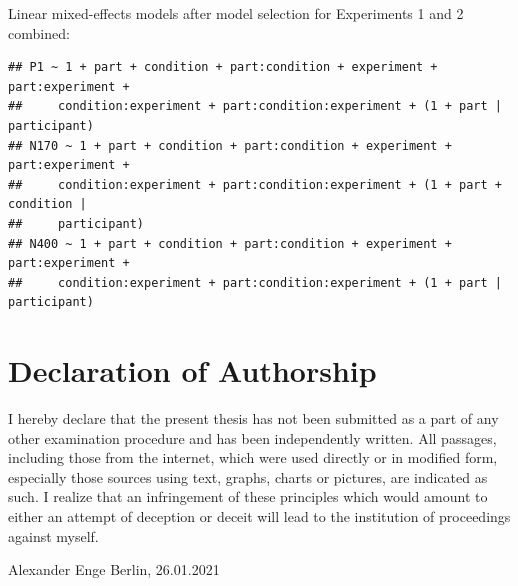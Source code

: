 \documentclass[
  english,
  doc,12pt,twoside,floatsintext]{apa7}
\begin{document}
\normalsize

\noindent Linear mixed-effects models after model selection for Experiments 1 and 2 combined:

\footnotesize

\begin{verbatim}
## P1 ~ 1 + part + condition + part:condition + experiment + part:experiment + 
##     condition:experiment + part:condition:experiment + (1 + part | participant)
## N170 ~ 1 + part + condition + part:condition + experiment + part:experiment + 
##     condition:experiment + part:condition:experiment + (1 + part + condition | 
##     participant)
## N400 ~ 1 + part + condition + part:condition + experiment + part:experiment + 
##     condition:experiment + part:condition:experiment + (1 + part | participant)
\end{verbatim}

\normalsize

\newpage
\setlength{\parindent}{0.5in}

\hypertarget{declaration-of-authorship}{%
\section*{Declaration of Authorship}\label{declaration-of-authorship}}

I hereby declare that the present thesis has not been submitted as a part of any other examination procedure and has been independently written. All passages, including those from the internet, which were used directly or in modified form, especially those sources using text, graphs, charts or pictures, are indicated as such. I realize that an infringement of these principles which would amount to either an attempt of deception or deceit will lead to the institution of proceedings against myself.

\vspace*{20mm}

\noindent
Alexander Enge\newline
Berlin, 26.01.2021

\clearpage

\mbox{}\thispagestyle{empty}\clearpage

\clearpage

\mbox{}\thispagestyle{empty}\clearpage
\end{document}
